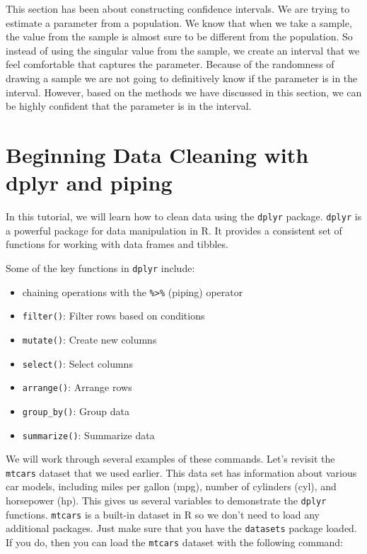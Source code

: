 \documentclass[
  letterpaper,
  DIV=11,
  numbers=noendperiod]{scrreprt}
\providecommand{\tightlist}{%
  \setlength{\itemsep}{0pt}\setlength{\parskip}{0pt}}\usepackage{longtable,booktabs,array}
\begin{document}
This section has been about constructing confidence intervals. We are
trying to estimate a parameter from a population. We know that when we
take a sample, the value from the sample is almost sure to be different
from the population. So instead of using the singular value from the
sample, we create an interval that we feel comfortable that captures the
parameter. Because of the randomness of drawing a sample we are not
going to definitively know if the parameter is in the interval. However,
based on the methods we have discussed in this section, we can be highly
confident that the parameter is in the interval.


\chapter*{Beginning Data Cleaning with dplyr and
piping}\label{beginning-data-cleaning-with-dplyr-and-piping}


In this tutorial, we will learn how to clean data using the
\texttt{dplyr} package. \texttt{dplyr} is a powerful package for data
manipulation in R. It provides a consistent set of functions for working
with data frames and tibbles.

Some of the key functions in \texttt{dplyr} include:

\begin{itemize}
\tightlist
\item
  chaining operations with the \texttt{\%\textgreater{}\%} (piping)
  operator
\item
  \texttt{filter()}: Filter rows based on conditions
\item
  \texttt{mutate()}: Create new columns
\item
  \texttt{select()}: Select columns
\item
  \texttt{arrange()}: Arrange rows
\item
  \texttt{group\_by()}: Group data
\item
  \texttt{summarize()}: Summarize data
\end{itemize}

We will work through several examples of these commands. Let's revisit
the \texttt{mtcars} dataset that we used earlier. This data set has
information about various car models, including miles per gallon (mpg),
number of cylinders (cyl), and horsepower (hp). This gives us several
variables to demonstrate the \texttt{dplyr} functions. \texttt{mtcars}
is a built-in dataset in R so we don't need to load any additional
packages. Just make sure that you have the \texttt{datasets} package
loaded. If you do, then you can load the \texttt{mtcars} dataset with
the following command:
\end{document}
